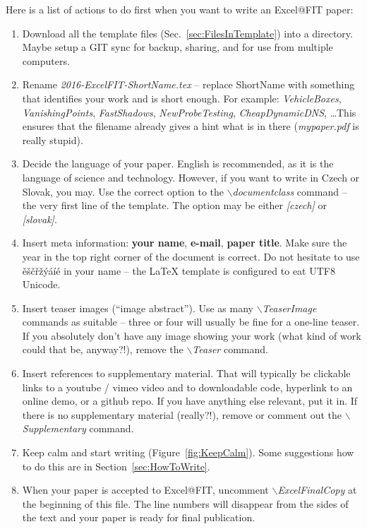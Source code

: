 \documentclass{ExcelAtFIT}
\begin{document}
Here is a list of actions to do first when you want to write an Excel@FIT paper:
\begin{enumerate}
	\item Download all the template files (Sec.~\ref{sec:FilesInTemplate}) into a directory. Maybe setup a GIT sync for backup, sharing, and for use from multiple computers.
	\item Rename \textit{2016-ExcelFIT-ShortName.tex} -- replace ShortName with something that identifies your work and is short enough.  For example: \textit{VehicleBoxes}, \textit{VanishingPoints}, \textit{FastShadows}, \textit{NewProbeTesting}, \textit{CheapDynamicDNS}, \ldots  This ensures that the filename already gives a hint what is in there (\textit{mypaper.pdf} is really stupid).
	\item Decide the language of your paper.  English is recommended, as it is the language of science and technology.  However, if you want to write in Czech or Slovak, you may.  Use the correct option to the \textit{$\backslash$documentclass} command -- the very first line of the template.  The option may be either \textit{[czech]} or \textit{[slovak]}.
	\item Insert meta information: \textbf{your name}, \textbf{e-mail}, \textbf{paper title}.  Make sure the year in the top right corner of the document is correct.  Do not hesitate to use ěščřžýáíé in your name -- the \LaTeX{} template is configured to eat UTF8 Unicode.
	\item Insert teaser images (``image abstract'').  Use as many \textit{$\backslash$TeaserImage} commands as suitable -- three or four will usually be fine for a one-line teaser.  If you absolutely don't have any image showing your work (what kind of work could that be, anyway?!), remove the \textit{$\backslash$Teaser} command.
	\item Insert references to supplementary material.  That will typically be clickable links to a youtube / vimeo video and to downloadable code, hyperlink to an online demo, or a github repo. If you have anything else relevant, put it in.  If there is no supplementary material (really?!), remove or comment out the \textit{$\backslash$Supplementary} command.
	\item Keep calm and start writing (Figure~\ref{fig:KeepCalm}).  Some suggestions how to do this are in Section~\ref{sec:HowToWrite}.
	\item When your paper is accepted to Excel@FIT, uncomment \textit{$\backslash$ExcelFinalCopy} at the beginning of this file.  The line numbers will disappear from the sides of the text and your paper is ready for final publication.
\end{enumerate}
\end{document}
